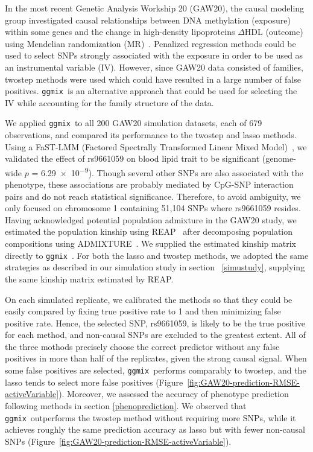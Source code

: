 \documentclass[12pt,letter]{article}\usepackage[]{graphicx}\usepackage[]{color}
\newcommand{\ggmix}{\texttt{ggmix}}
\begin{document}
In the most recent Genetic Analysis Workship 20 (GAW20),  the causal modeling group investigated causal relationships between DNA methylation (exposure) within some genes and the change in high-density lipoproteins $\Delta$HDL (outcome) using Mendelian randomization (MR)~\citep{davey2003mendelian}.
Penalized regression methods could be used to select SNPs strongly associated with the exposure in order to be used as an instrumental variable (IV).
However, since GAW20 data consisted of families, twostep methods were used which could have resulted in a large number of false positives. \ggmix~is an alternative approach that could be used for selecting the IV while accounting for the family structure of the data.

We applied \ggmix ~to all 200 GAW20 simulation datasets, each of 679 observations, and compared its performance to the twostep and lasso methods.
Using a FaST-LMM (Factored Spectrally Transformed Linear Mixed Model)~\citep{howey2018application}, we validated the effect of rs9661059 on blood lipid trait to be significant (genome-wide $p$ = \num{6.29e-9}).
Though several other SNPs are also associated with the phenotype, these associations are probably mediated by CpG-SNP interaction pairs and do not reach statistical significance.
Therefore, to avoid ambiguity, we only focused on chromosome 1 containing 51,104 SNPs where rs9661059 resides.
Having acknowledged potential population admixture in the GAW20 study, we estimated the population kinship using REAP~\citep{thornton2012estimating} after decomposing population compositions using ADMIXTURE~\citep{alexander2009fast}. We supplied the estimated kinship matrix directly to \ggmix~.
For both the lasso and twostep methods, we adopted the same strategies as described in our simulation study in section ~\ref{simustudy}, supplying the same kinship matrix estimated by REAP.

On each simulated replicate, we calibrated the methods so that they could be easily compared by fixing true positive rate to 1 and then minimizing false positive rate. Hence, the selected SNP, rs9661059, is likely to be the true positive for each method, and non-causal SNPs are excluded to the greatest extent.
All of the three mothods precisely choose the correct predictor without any false positives in more than half of the replicates, given the strong causal signal. When some false positives are selected, \ggmix ~performs comparably to twostep, and the lasso tends to select more false positives (Figure~\ref{fig:GAW20-prediction-RMSE-activeVariable}).
Moreover, we assessed the accuracy of phenotype prediction following methods in section \ref{phenoprediction}. We observed that \ggmix ~outperforms the twostep method without requiring more SNPs, while it achieves roughly the same prediction accuracy as lasso but with fewer non-causal SNPs (Figure~\ref{fig:GAW20-prediction-RMSE-activeVariable}).
\end{document}
